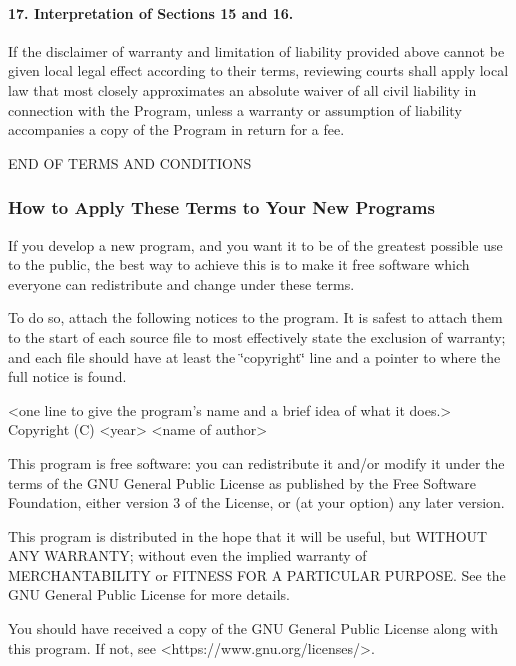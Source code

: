 \paragraph*{17. Interpretation of Sections 15 and 16.}

If the disclaimer of warranty and limitation of liability provided above cannot be given local legal effect according to their terms, reviewing courts shall apply local law that most closely approximates an absolute waiver of all civil liability in connection with the Program, unless a warranty or assumption of liability accompanies a copy of the Program in return for a fee.

E\+ND OF T\+E\+R\+MS A\+ND C\+O\+N\+D\+I\+T\+I\+O\+NS

\subsubsection*{How to Apply These Terms to Your New Programs}

If you develop a new program, and you want it to be of the greatest possible use to the public, the best way to achieve this is to make it free software which everyone can redistribute and change under these terms.

To do so, attach the following notices to the program. It is safest to attach them to the start of each source file to most effectively state the exclusion of warranty; and each file should have at least the \char`\"{}copyright\char`\"{} line and a pointer to where the full notice is found. \begin{DoxyVerb}    <one line to give the program's name and a brief idea of what it does.>
    Copyright (C) <year>  <name of author>

    This program is free software: you can redistribute it and/or modify
    it under the terms of the GNU General Public License as published by
    the Free Software Foundation, either version 3 of the License, or
    (at your option) any later version.

    This program is distributed in the hope that it will be useful,
    but WITHOUT ANY WARRANTY; without even the implied warranty of
    MERCHANTABILITY or FITNESS FOR A PARTICULAR PURPOSE.  See the
    GNU General Public License for more details.

    You should have received a copy of the GNU General Public License
    along with this program.  If not, see <https://www.gnu.org/licenses/>.
\end{DoxyVerb}


